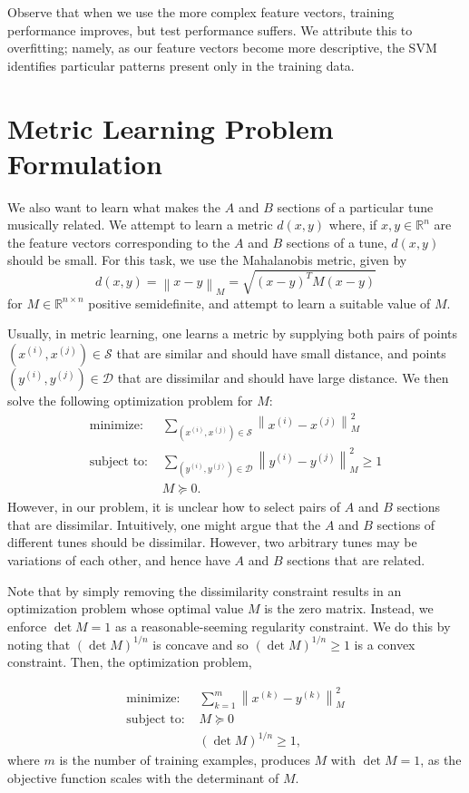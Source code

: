 \documentclass{article} %
\newcommand{\xip}{x^{(i)}}
\newcommand{\xjp}{x^{(j)}}
\newcommand{\yip}{y^{(i)}}
\newcommand{\yjp}{y^{(j)}}
\newcommand{\vectornorm}[1]{\left\| #1 \right\|}
\begin{document}
Observe that when we use the more complex feature vectors, training performance
improves, but test performance suffers. We attribute this to overfitting;
namely, as our feature vectors become more descriptive, the SVM identifies
particular patterns present only in the training data.

\section{Metric Learning Problem Formulation}
We also want to learn what makes the $A$ and $B$ sections of a particular tune
musically related. We attempt to learn a metric $d(x, y)$ where, if $x, y \in
\mathbb{R}^n$ are the feature vectors corresponding to the $A$ and $B$ sections
of a tune, $d(x, y)$ should be small. For this task, we use the Mahalanobis
metric, given by
\[
d(x,y) = \vectornorm{x-y}_M = \sqrt{(x-y)^T M (x-y)}
\] 
for $M \in \mathbb{R}^{n\times n}$ positive semidefinite, and attempt to learn a
suitable value of $M$.

Usually, in metric learning, one learns a metric by supplying both pairs of
points $(\xip, \xjp) \in \mathcal{S}$ that are similar and should have small
distance, and points $(\yip, \yjp) \in \mathcal{D}$ that are dissimilar and
should have large distance. We then solve the following optimization problem for
$M$: %
\begin{align*} 
\text{minimize: } &
\sum_{(x^{(i)}, x^{(j)}) \in \mathcal S} \vectornorm{x^{(i)} - x^{(j)}}_M^2 \\
\text{subject to: }
& \sum_{(y^{(i)}, y^{(j)}) \in \mathcal D}
	\vectornorm{y^{(i)} - y^{(j)}}_M^2 \ge 1 \\
& M \succeq 0.
\end{align*} 
However, in our problem, it is unclear how to select pairs of $A$ and $B$
sections that are dissimilar. Intuitively, one might argue that the $A$ and $B$
sections of different tunes should be dissimilar. However, two arbitrary tunes
may be variations of each other, and hence have $A$ and $B$ sections that are
related.

Note that by simply removing the dissimilarity constraint results in an
optimization problem whose optimal value $M$ is the zero matrix. Instead, we
enforce $\det M = 1$ as a reasonable-seeming regularity constraint. We do this
by noting that $(\det M)^{1/n}$ is concave and so $(\det M)^{1/n} \ge 1$ is a
convex constraint. Then, the optimization problem,

\begin{align*} 
\text{minimize: } & \sum_{k=1}^m \vectornorm{x^{(k)} - y^{(k)}}_M^2 \\
\text{subject to: }
& M \succeq 0 \\
& (\det M)^{1/n} \ge 1,
\end{align*} 
where $m$ is the number of training examples, produces $M$ with $\det M = 1$, as
the objective function scales with the determinant of $M$.
\end{document}
